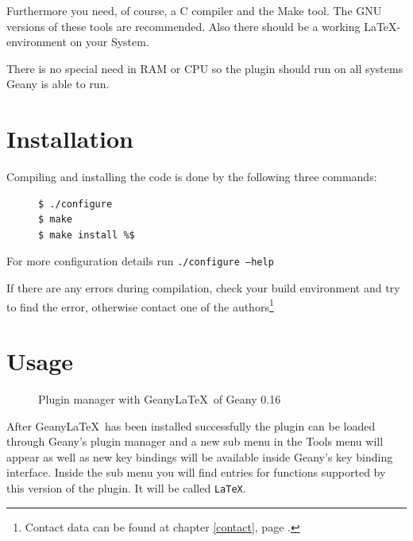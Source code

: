 \documentclass[%
a4paper,%
10pt,%
oneside,%
DIV18,
headsepline,
plainheadsepline,
footsepline,
plainfootsepline,
bibtotoc,%
liststotoc,%
BCOR12mm,%
halfparskip,%
openany,%
]{scrartcl}
\begin{document}
Furthermore you need, of course, a C compiler and the Make tool. The
GNU versions of these tools are recommended. Also there should be a
working \LaTeX-environment on your System.

There is no special need in RAM or CPU so the plugin should run on
all systems Geany is able to run.

\section{Installation}
Compiling and installing the code is done by the following three
commands:

\begin{figure}[h!]
\begin{lstlisting}
$ ./configure
$ make
$ make install %$
\end{lstlisting}
\end{figure}

For more configuration details run \texttt{./configure --help}

If there are any errors during compilation, check your build environment
and try to find the error, otherwise contact one of the
authors\footnote{Contact data can be found at chapter \ref{contact},
page \pageref{contact}.}


\section{Usage}

\begin{figure}[h!]
	\caption{Plugin manager with Geany\LaTeX\ of Geany 0.16}
\end{figure}

After Geany\LaTeX\ has been installed successfully the plugin can be
loaded through Geany's plugin manager and a new sub menu in the Tools
menu will appear as well as new key bindings will be available inside
Geany's key binding interface. Inside the sub menu you will find entries
for functions supported by this version of the plugin. It will be
called \texttt{LaTeX}.
\end{document}
